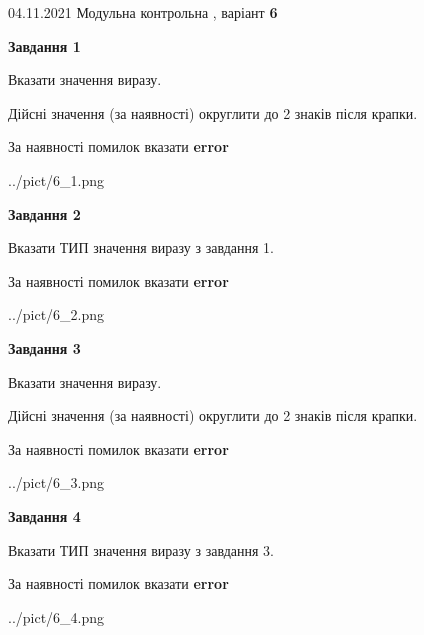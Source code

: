 \documentclass[11pt, ukrainian]{article}
\begin{document}
{04.11.2021 Модульна контрольна , варіант  \No \textbf { 6 }\par}
{
\begin {large}
{\begin {center}\textbf{Завдання 1}\end {center}}\par
Вказати значення виразу. \par
Дійсні значення (за наявності) округлити до 2 знаків після крапки. \par
За наявності помилок вказати \textbf{error}

\begin{center}
	{../pict/6_1.png}
\end{center}
\newpage

{\begin {center}\textbf{Завдання 2}\end {center}}\par
Вказати ТИП значення виразу з завдання 1. \par
За наявності помилок вказати \textbf{error}

\begin{center}
	{../pict/6_2.png}
\end{center}
\newpage

{\begin {center}\textbf{Завдання 3}\end {center}}\par
Вказати значення виразу. \par
Дійсні значення (за наявності) округлити до 2 знаків після крапки. \par
За наявності помилок вказати \textbf{error}

\begin{center}
	{../pict/6_3.png}
\end{center}
\newpage

{\begin {center}\textbf{Завдання 4}\end {center}}\par
Вказати ТИП значення виразу з завдання 3. \par
За наявності помилок вказати \textbf{error}

\begin{center}
	{../pict/6_4.png}
\end{center}
\newpage


\end{large}}
\end{document}
